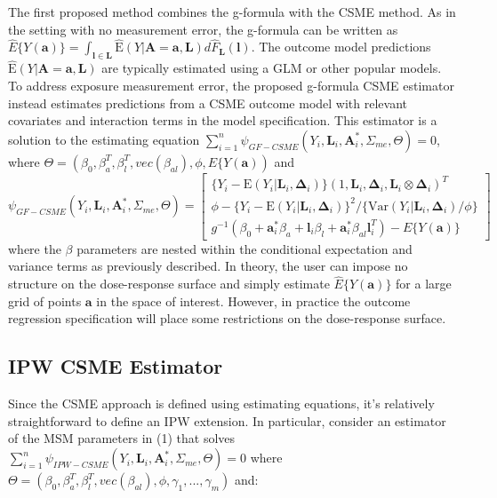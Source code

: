 \documentclass[useAMS,usenatbib,referee]{biom}
\begin{document}
\sloppy The first proposed method combines the g-formula with the CSME method. As in the setting with no measurement error, the g-formula can be written as $\hat{E}\{ Y(\bm{a}) \} = \int_{\bm{l} \in \bm{L}} \hat{\text{E}}(Y | \bm{A} = \bm{a}, \bm{L}) d\hat{F}_{\bm{L}}(\bm{l})$. The outcome model predictions $\hat{\text{E}}(Y | \bm{A} = \bm{a}, \bm{L})$ are typically estimated using a GLM or other popular models. To address exposure measurement error, the proposed g-formula CSME estimator instead estimates predictions from a CSME outcome model with relevant covariates and interaction terms in the model specification. This estimator is a solution to the estimating equation $\sum_{i=1}^{n} \psi_{GF-CSME}(Y_{i}, \bm{L}_{i}, \bm{A}_{i}^{*}, \Sigma_{me}, \Theta) = 0$, where $\Theta = (\beta_{0}, \beta^{T}_{a}, \beta^{T}_{l}, vec(\beta_{al}), \phi, E \{ Y(\bm{a}))$ and
\begin{equation}
    \psi_{GF-CSME}(Y_{i}, \bm{L}_{i}, \bm{A}^{*}_{i}, \Sigma_{me}, \Theta) =
    \begin{bmatrix}
       \{ Y_{i} - \text{E}(Y_{i} | \bm{L}_{i}, \bm{\Delta}_{i}) \} (1, \bm{L}_{i}, \bm{\Delta}_{i}, \bm{L}_{i} \otimes \bm{\Delta}_{i})^{T} \\
        \phi - \{ Y_{i} - \text{E}(Y_{i} | \bm{L}_{i}, \bm{\Delta}_{i}) \}^{2} / \{ \text{Var}(Y_{i} | \bm{L}_{i}, \bm{\Delta}_{i}) / \phi \} \\
        g^{-1}(\beta_{0} + \bm{a}^{*}_{i}\beta_{a} + \bm{l}_{i}\beta_{l} +
        \bm{a}^{*}_{i}\beta_{al}\bm{l}_{i}^{T}) - E \{ Y(\bm{a}) \}
    \end{bmatrix}
\end{equation}
where the $\beta$ parameters are nested within the conditional expectation and variance terms as previously described. In theory, the user can impose no structure on the dose-response surface and simply estimate $\hat{E}\{ Y(\bm{a}) \}$ for a large grid of points $\bm{a}$ in the space of interest. However, in practice the outcome regression specification will place some restrictions on the dose-response surface.

\subsection{IPW CSME Estimator}

Since the CSME approach is defined using estimating equations, it's relatively straightforward to define an IPW extension. In particular, consider an estimator of the MSM parameters in (1) that solves $\sum_{i=1}^{n} \psi_{IPW-CSME}(Y_{i}, \bm{L}_{i}, \bm{A}^{*}_{i}, \Sigma_{me}, \Theta) = 0$ where $\Theta = (\beta_{0}, \beta^{T}_{a}, \beta^{T}_{l}, vec(\beta_{al}), \phi, \gamma_{1}, ..., \gamma_{m})$ and:
\end{document}
